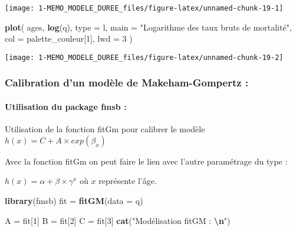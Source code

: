 \documentclass[
]{article}
\newenvironment{Shaded}{\begin{snugshade}}{\end{snugshade}}
\newcommand{\AttributeTok}[1]{\textcolor[rgb]{0.13,0.29,0.53}{#1}}
\newcommand{\DecValTok}[1]{\textcolor[rgb]{0.00,0.00,0.81}{#1}}
\newcommand{\FunctionTok}[1]{\textcolor[rgb]{0.13,0.29,0.53}{\textbf{#1}}}
\newcommand{\NormalTok}[1]{#1}
\newcommand{\OtherTok}[1]{\textcolor[rgb]{0.56,0.35,0.01}{#1}}
\newcommand{\SpecialCharTok}[1]{\textcolor[rgb]{0.81,0.36,0.00}{\textbf{#1}}}
\newcommand{\StringTok}[1]{\textcolor[rgb]{0.31,0.60,0.02}{#1}}
\begin{document}
\begin{center}\texttt{[image: 1-MEMO\_MODELE\_DUREE\_files/figure-latex/unnamed-chunk-19-1]} \end{center}

\begin{Shaded}
\begin{Highlighting}[]
\FunctionTok{plot}\NormalTok{(}
\NormalTok{  ages,}
  \FunctionTok{log}\NormalTok{(q),}
  \AttributeTok{type =} \StringTok{\textquotesingle{}l\textquotesingle{}}\NormalTok{,}
  \AttributeTok{main =} \StringTok{"Logarithme des taux bruts de mortalité"}\NormalTok{,}
  \AttributeTok{col =}\NormalTok{ palette\_couleur[}\DecValTok{1}\NormalTok{],}
  \AttributeTok{lwd =} \DecValTok{3}
\NormalTok{)}
\end{Highlighting}
\end{Shaded}

\begin{center}\texttt{[image: 1-MEMO\_MODELE\_DUREE\_files/figure-latex/unnamed-chunk-19-2]} \end{center}

\hypertarget{calibration-dun-moduxe8le-de-makeham-gompertz}{%
\subsubsection{Calibration d'un modèle de Makeham-Gompertz
:}\label{calibration-dun-moduxe8le-de-makeham-gompertz}}

\hypertarget{utilisation-du-package-fmsb}{%
\paragraph{Utilisation du package fmsb
:}\label{utilisation-du-package-fmsb}}

Utilisation de la fonction fitGm pour calibrer le modèle
\(h(x) = C + A \times exp(\beta_x)\)

Avec la fonction fitGm on peut faire le lien avec l'autre paramétrage du
type :

\(h(x) = \alpha + \beta \times \gamma^{x}\) où \(x\) représente l'âge.

\begin{Shaded}
\begin{Highlighting}[]
\FunctionTok{library}\NormalTok{(fmsb)}
\NormalTok{fit }\OtherTok{=} \FunctionTok{fitGM}\NormalTok{(}\AttributeTok{data =}\NormalTok{ q) }

\NormalTok{A }\OtherTok{=}\NormalTok{ fit[}\DecValTok{1}\NormalTok{]}
\NormalTok{B }\OtherTok{=}\NormalTok{ fit[}\DecValTok{2}\NormalTok{]}
\NormalTok{C }\OtherTok{=}\NormalTok{ fit[}\DecValTok{3}\NormalTok{]}
\FunctionTok{cat}\NormalTok{(}\StringTok{"Modélisation fitGM :  }\SpecialCharTok{\textbackslash{}n}\StringTok{"}\NormalTok{)}
\end{Highlighting}
\end{Shaded}
\end{document}
